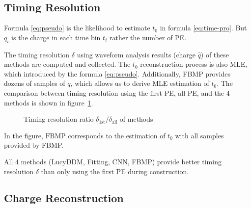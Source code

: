 \subsection{Timing Resolution}


Formula \eqref{eq:pseudo} is the likelihood to estimate $t_{0}$ in formula \eqref{eq:time-pro}. But $q_{i}$ is the charge in each time bin $t_{i}$ rather the number of PE. 

The timing resolution $\delta$ using waveform analysis results (charge $\hat{q}$) of these methods are computed and collected. The $t_{0}$ reconstruction process is also MLE, which introduced by the formula \eqref{eq:pseudo}. Additionally, FBMP provides dozens of samples of $q$, which allows us to derive MLE estimation of $t_{0}$. The comparison between timing resolution using the first PE, all PE, and the 4 methods is shown in figure~\ref{fig:deltamethods}. 

\begin{figure}[H]
    \centering
    \resizebox{\textwidth}{!}{}
    \caption{\label{fig:deltamethods} Timing resolution ratio $\delta_{\mathrm{1st}}/\delta_{\mathrm{all}}$ of methods}
\end{figure}

In the figure, $\mathrm{FBMP}$ corresponds to the estimation of $t_{0}$ with all samples provided by FBMP. 

All 4 methods (LucyDDM, Fitting, CNN, FBMP) provide better timing resolution $\delta$ than only using the first PE during construction. 

\subsection{Charge Reconstruction}

